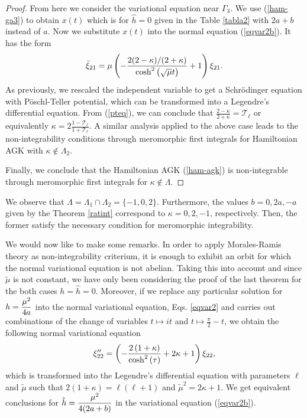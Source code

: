 \documentclass[final]{siamart0516}
\begin{document}
\begin{proof}
From here we consider the variational equation near  $\Gamma_3$.  
We use  (\ref{ham-ga3})  to obtain $x(t)$  which is for $\hat{h}=0$ given in the 
Table \ref{tabla2} with $2a+b$ instead of $a$. Now we substitute $x(t)$ 
 into the normal equation (\ref{eqvar2b}). It has the form
\begin{eqnarray}
\ddot\xi_{21}=\mu\left(-{2(2-\kappa)/(2+\kappa)\over
\cosh^2\left(\sqrt{\mu}t\right)}+1\right)\xi_{21}\label{ev21_3}.
\end{eqnarray}
As previously, we rescaled the independent variable  to get a Schr\"odinger equation with P\"oschl-Teller 
potential, which can be transformed into a Legendre's differential equation.
From (\ref{pteq}), we can conclude that   
$\displaystyle{\frac{2-\kappa}{2+\kappa} =  {\mathcal T}_\ell}$ or equivalently
$\displaystyle{\kappa = 2\frac{1-{\mathcal T}_\ell}{1+{\mathcal T}_\ell}}$.
A similar analysis applied  to the above case  leads to the  non-integrability conditions 
 through meromorphic first integrals for  Hamiltonian AGK with  $\kappa \notin \Lambda_2$.

Finally,  we conclude that the Hamiltonian AGK (\ref{ham-agk}) is non-integrable through  meromorphic first integrals for 
 $\kappa\notin \Lambda$.
\end{proof}

We observe that $\Lambda = \Lambda_1 \cap \Lambda_2 = \{-1,0,2\}$. Furthermore, the values $b=0, 2a, -a$ given by  the Theorem \ref{ratint}  correspond to 
 $\kappa = 0,2,-1$, respectively. Then, the former  satisfy   the necessary condition for  meromorphic integrability.

We would now like to make some remarks.
In order to apply Morales-Ramis theory as non-integrability criterium, it is 
enough to exhibit an orbit for which the normal variational equation is not abelian. 
Taking this into account and since 
$\widetilde{\mu}$ is not constant,  we have only been considering  the proof 
of the last theorem for the both cases $h=\hat{h}=0$. 
Moreover, if we replace any particular solution for $\displaystyle{h={\mu^2\over 4a}}$  into the normal variational equation, Eqs. \eqref{eqvar2} 
and carries out combinations of the change of variables $t\mapsto i t$ and  $t\mapsto \frac{\pi}{2}-t$,  we obtain the following normal variational equation
%
\begin{equation}\label{integra-legendre2}
\xi_{22}''=\left(-{2\left(1+\kappa\right)\over
\cosh^2\left(\tau\right)}+2\kappa+1\right)\xi_{22},
\end{equation}
which is transformed into the Legendre's differential equation with parameters $\ell$ and $\tilde{\mu}$ such that $2(1+\kappa)=\ell(\ell + 1)$ and $\tilde{\mu}^2=2\kappa+1$. We get equivalent conclusions for $\displaystyle{\hat{h}={\mu^2\over 4(2a+b)}}$ in the variational equation (\ref{eqvar2b}).
\end{document}
